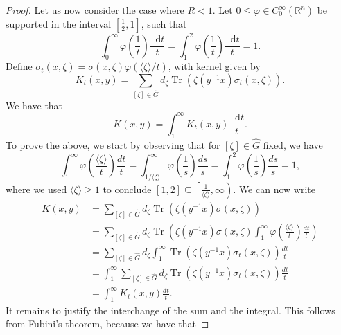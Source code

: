 \documentclass[12pt, reqno]{amsart}
\theoremstyle{definition}
\theoremstyle{remark}
\numberwithin{equation}{section}
\newcommand*\diff{\mathop{}\!\mathrm{d}}
\begin{document}
\begin{proof}
   Let us now consider the case where $R<1$. Let $0\leq\varphi\in C^{\infty}_{0}(\mathbb{R}^n)$ be supported in the interval $[\frac{1}{2},1]$, such that
   \begin{equation*}
       \int_{0}^{\infty}\varphi\left(\frac{1}{t}\right)\frac{\diff{t}}{t}= \int_{1}^{2}\varphi\left(\frac{1}{t}\right)\frac{\diff{t}}{t}=1.
   \end{equation*}
   Define $\sigma_t(x,\zeta)=\sigma(x,\zeta)\varphi(\langle\zeta\rangle/t)$, with kernel given by
   \begin{equation*}
       K_t(x,y)=\sum_{[\zeta]\in\widehat{G}}d_\zeta\operatorname{Tr}(\zeta(y^{-1}x)\sigma_t(x,\zeta)).
   \end{equation*}
   We have that 
   \begin{equation}
       K(x,y)=\int_{1}^{\infty}K_t(x,y)\frac{\diff{t}}{t}. 
       \label{kernel}
   \end{equation}
 To prove the above, we start by observing that for $[\zeta]\in\widehat{G}$ fixed, we have
\begin{equation*}
    \int_{1}^{\infty}\varphi\left(\frac{\langle\zeta\rangle}{t}\right)\frac{dt}{t}=\int_{1/\langle\zeta\rangle}^{\infty}\varphi\left(\frac{1}{s}\right)\frac{ds}{s}=\int_{1}^{2}\varphi\left(\frac{1}{s}\right)\frac{ds}{s}=1,
\end{equation*}
where we used $\langle \zeta \rangle \geq 1$ to conclude $[1,2] \subseteq \left[ \frac{1}{\langle \zeta \rangle}, \infty \right)$. We can now write
\begin{equation*}
    \begin{aligned}
        K(x,y)&=\sum_{[\zeta]\in\widehat{G}}d_\zeta\operatorname{Tr}(\zeta(y^{-1}x)\sigma(x,\zeta))\\
    &=\sum_{[\zeta]\in\widehat{G}}d_\zeta\operatorname{Tr}\left(\zeta(y^{-1}x)\sigma(x,\zeta) \int_{1}^{\infty}\varphi\left(\frac{\langle\zeta\rangle}{t}\right)\frac{dt}{t}\right)\\
    &=\sum_{[\zeta]\in\widehat{G}}d_\zeta\int_{1}^{\infty}\operatorname{Tr}(\zeta(y^{-1}x)\sigma_t(x,\zeta))\frac{dt}{t}\\
    &=\int_{1}^{\infty}\sum_{[\zeta]\in\widehat{G}}d_\zeta\operatorname{Tr}(\zeta(y^{-1}x)\sigma_t(x,\zeta))\frac{dt}{t}\\
    &=\int_{1}^{\infty}K_t(x,y)\frac{dt}{t}.
    \end{aligned}
\end{equation*}
It remains to justify the interchange of the sum and the integral. This follows from Fubini’s theorem, because we have that

\end{proof}
\end{document}
